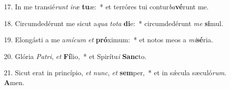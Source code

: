 17. In me transié\textit{runt} \textit{i}\textit{ræ} \textbf{tu}æ:~*  et terróres tui contur\textit{ba}\textbf{vé}runt me.\

18. Circumdedérunt me sicut a\textit{qua} \textit{to}\textit{ta} \textbf{di}e:~*  circumdedérunt \textit{me} \textbf{si}mul.\

19. Elongásti a me a\textit{mí}\textit{cum} \textit{et} \textbf{pró}ximum:~*  et notos meos a \textit{mi}\textbf{sé}ria.\

20. Glória \textit{Pa}\textit{tri}, \textit{et} \textbf{Fí}lio,~*  et Spirítu\textit{i} \textbf{Sanc}to.\

21. Sicut erat in princípio, \textit{et} \textit{nunc}, \textit{et} \textbf{sem}per,~*  et in sǽcula sæculó\textit{rum}. \textbf{A}men.\

